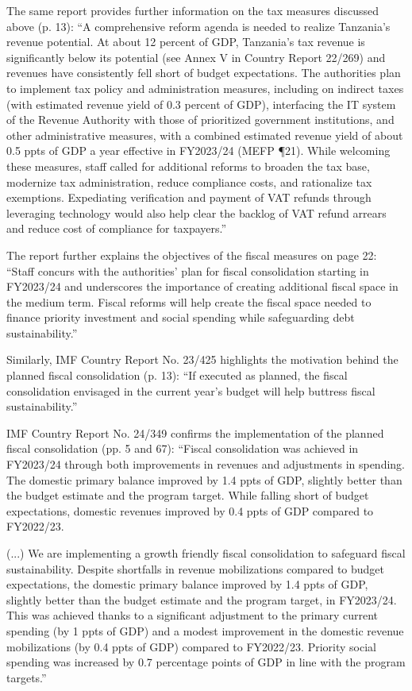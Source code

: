 The same report provides further information on the tax measures discussed above (p. 13): “A  comprehensive reform agenda is needed to realize Tanzania’s revenue potential. At about 12 percent of GDP, Tanzania’s tax revenue is significantly below its potential (see Annex V in Country Report 22/269) and revenues have consistently fell short of budget expectations. The authorities plan to implement tax policy and administration measures, including on indirect taxes (with estimated revenue yield of 0.3 percent of GDP), interfacing the IT system of the Revenue Authority with those of prioritized government institutions, and other administrative measures, with a combined estimated revenue yield of about 0.5 ppts of GDP a year effective in FY2023/24 (MEFP ¶21). While welcoming these measures, staff called for additional reforms to broaden the tax base, modernize tax administration, reduce compliance costs, and rationalize tax exemptions. Expediating verification and payment of VAT refunds through leveraging technology would also help clear the backlog of VAT refund arrears and reduce cost of compliance for taxpayers.”

The report further explains the objectives of the fiscal measures on page 22: “Staff concurs with the authorities’ plan for fiscal consolidation starting in FY2023/24 and underscores the importance of creating additional fiscal space in the medium term. Fiscal reforms will help create the fiscal space needed to finance priority investment and social spending while safeguarding debt sustainability.”

Similarly, IMF Country Report No. 23/425 highlights the motivation behind the planned fiscal consolidation (p. 13): “If executed as planned, the fiscal consolidation envisaged in the current year’s budget will help buttress fiscal sustainability.”

IMF Country Report No. 24/349 confirms the implementation of the planned fiscal consolidation (pp. 5 and 67): “Fiscal consolidation was achieved in FY2023/24 through both improvements in revenues and adjustments in spending. The domestic  primary balance improved by 1.4 ppts of GDP, slightly better than the budget estimate and the program target. While falling short of budget expectations, domestic revenues improved by 0.4 ppts of GDP compared to FY2022/23.

(...) We are implementing a growth friendly fiscal consolidation to safeguard fiscal sustainability. Despite shortfalls in revenue mobilizations compared to budget expectations, the domestic primary balance improved by 1.4 ppts of GDP, slightly better than the budget estimate and the program target, in FY2023/24. This was achieved thanks to a significant adjustment to the primary current spending (by 1 ppts of GDP) and a modest improvement in the domestic revenue mobilizations (by 0.4 ppts of GDP) compared to FY2022/23. Priority social spending was increased by 0.7 percentage points of GDP in line with the program targets.”  


